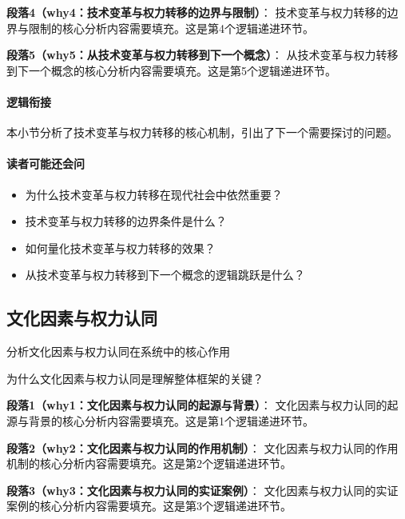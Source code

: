 \documentclass[../main.tex]{subfiles}
\begin{document}
{{\textbf{段落4（why4：技术变革与权力转移的边界与限制）}：
技术变革与权力转移的边界与限制的核心分析内容需要填充。这是第4个逻辑递进环节。


\textbf{段落5（why5：从技术变革与权力转移到下一个概念）}：
从技术变革与权力转移到下一个概念的核心分析内容需要填充。这是第5个逻辑递进环节。


\paragraph*{逻辑衔接}
本小节分析了技术变革与权力转移的核心机制，引出了下一个需要探讨的问题。

\paragraph*{读者可能还会问}
\begin{itemize}
\item 为什么技术变革与权力转移在现代社会中依然重要？
\item 技术变革与权力转移的边界条件是什么？
\item 如何量化技术变革与权力转移的效果？
\item 从技术变革与权力转移到下一个概念的逻辑跳跃是什么？
\end{itemize}


\subsection{文化因素与权力认同}

\begin{motivation}
分析文化因素与权力认同在系统中的核心作用
\end{motivation}

\begin{logicmap}
[逻辑链占位]
\end{logicmap}

\begin{questionbox}
为什么文化因素与权力认同是理解整体框架的关键？
\end{questionbox}

\textbf{段落1（why1：文化因素与权力认同的起源与背景）}：
文化因素与权力认同的起源与背景的核心分析内容需要填充。这是第1个逻辑递进环节。


\textbf{段落2（why2：文化因素与权力认同的作用机制）}：
文化因素与权力认同的作用机制的核心分析内容需要填充。这是第2个逻辑递进环节。


\textbf{段落3（why3：文化因素与权力认同的实证案例）}：
文化因素与权力认同的实证案例的核心分析内容需要填充。这是第3个逻辑递进环节。


}}
\end{document}
